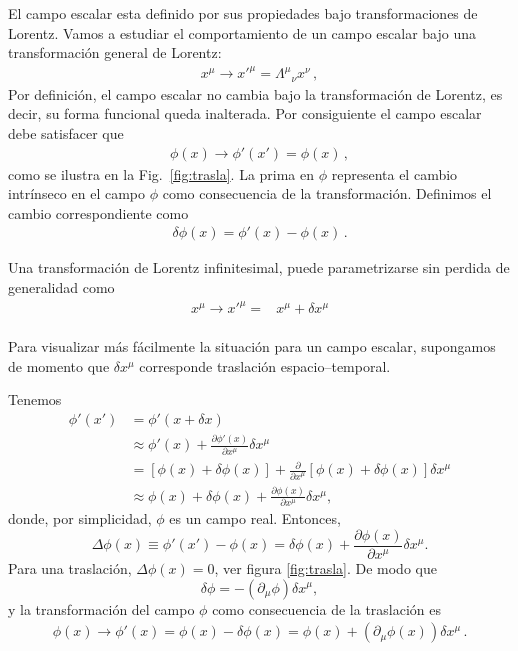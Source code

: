 El campo escalar esta definido por sus propiedades bajo transformaciones de Lorentz. Vamos a estudiar el comportamiento de un campo escalar bajo una transformación general de Lorentz:
\begin{align}
\label{eq:179qft}
  x^\mu\to {x'}^\mu={\Lambda^\mu}_\nu x^\nu\,,
\end{align}
Por definición, el campo escalar no cambia bajo la transformación de Lorentz, es decir, su forma funcional queda inalterada. Por consiguiente el campo escalar debe satisfacer que
\begin{align}
 \phi(x)\to  \phi'(x')=\phi(x)\,,
\end{align}
como se ilustra en la Fig.~\ref{fig:trasla}. La prima en $\phi$ representa el cambio intrínseco en el campo $\phi$ como consecuencia de la transformación. Definimos el cambio correspondiente como
\begin{align}
  \delta \phi(x)=\phi'(x)-\phi(x)\,.
\end{align}




Una transformación de Lorentz infinitesimal,
puede parametrizarse sin perdida de generalidad como
\begin{align}
  x^\mu\to{x'}^\mu=&x^\mu+\delta x^{\mu}\nonumber\\
\end{align}

Para visualizar más fácilmente la situación para un campo escalar, supongamos de momento que $\delta x^{\mu}$ corresponde  traslaci\'on espacio--temporal.

Tenemos
\begin{align}
  \phi'(x')&=\phi'(x+\delta x)\\
  &\approx\phi'(x)+\frac{\partial\phi'(x)}{\partial x^\mu}\delta x^\mu\\
  &=[\phi(x)+\delta\phi(x)]+\frac{\partial}{\partial x^\mu}[\phi(x)+\delta\phi(x)]\delta x^\mu\\
  &\approx\phi(x)+\delta\phi(x)+\frac{\partial\phi(x)}{\partial x^\mu}\delta x^\mu,
\end{align}
donde, por simplicidad, $\phi$ es un campo real. Entonces,
\begin{equation}
  \label{eq:Deltaf}
  \Delta\phi(x)\equiv\phi'(x')-\phi(x)=\delta\phi(x)+\frac{\partial\phi(x)}{\partial x^\mu}\delta x^\mu.
\end{equation}
Para una traslaci\'on, $\Delta\phi(x)=0$, ver figura 
\ref{fig:trasla}. %
De modo que
\begin{equation}
  \label{eq:dmuxmu}
  \delta\phi=-(\partial_\mu\phi)\delta x^\mu,
\end{equation}
y la transformaci\'on del campo $\phi$ como consecuencia de la traslaci\'on es
\begin{align}
  \phi(x)\to\phi'(x)=\phi(x)-\delta\phi(x)=\phi(x)+(\partial_\mu\phi(x))\delta x^\mu\,.
\end{align}

